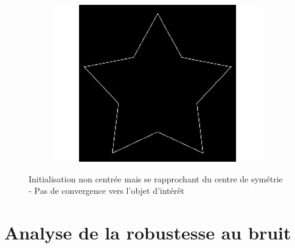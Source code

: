 \begin{appendices}
\begin{figure}[H]
\begin{subfigure}[c]{0.3\linewidth}
\includegraphics[width=\textwidth]{Chapters/Images/Init/vfcusym3}
\caption{}
\end{subfigure}
\caption{Initialisation non centrée mais se rapprochant du centre de symétrie - Pas de convergence vers l'objet d'intérêt}
\end{figure}

\section{Analyse de la robustesse au bruit}
\label{ann_noise_results}


\end{appendices}
